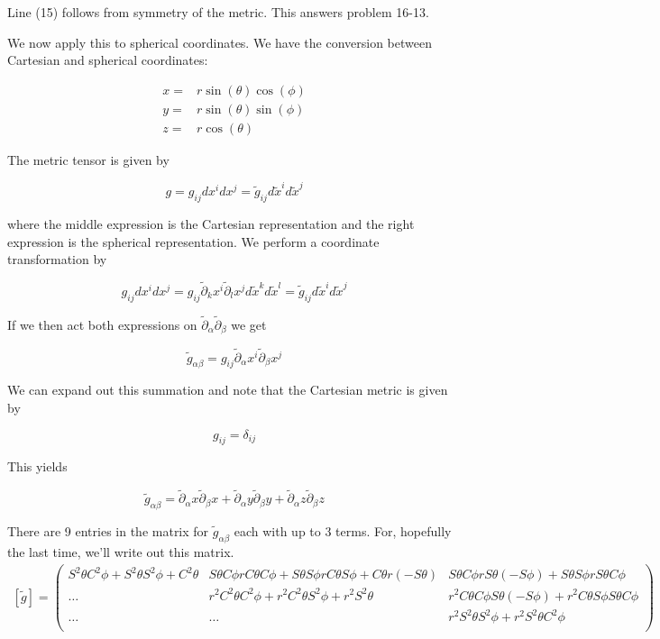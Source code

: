 \documentclass[12pt]{article}
\begin{document}
Line (15) follows from symmetry of the metric.
This answers problem 16-13.

We now apply this to spherical coordinates. We have the conversion between Cartesian and spherical coordinates:

\begin{align}
x =& r \sin(\theta) \cos(\phi)\\
y =& r \sin(\theta) \sin(\phi)\\
z =& r \cos(\theta)
\end{align}

The metric tensor is given by

$$
g = g_{ij} dx^i dx^j = \tilde{g}_{ij} d\tilde{x}^i d\tilde{x}^j
$$

where the middle expression is the Cartesian representation and the right expression is the spherical representation. We perform a coordinate transformation by

$$
g_{ij} dx^i dx^j = g_{ij} \tilde{\partial}_k x^i \tilde{\partial}_l x^j d\tilde{x}^k d\tilde{x}^l = \tilde{g}_{ij} d\tilde{x}^i d\tilde{x}^j
$$

If we then act both expressions on $\tilde{\partial}_{\alpha} \tilde{\partial}_{\beta}$ we get

$$
\tilde{g}_{\alpha\beta} = g_{ij} \tilde{\partial}_{\alpha} x^i \tilde{\partial}_{\beta} x^j
$$

We can expand out this summation and note that the Cartesian metric is given by

$$
g_{ij} = \delta_{ij}
$$

This yields

$$
\tilde{g}_{\alpha\beta} = \tilde{\partial}_{\alpha} x \tilde{\partial}_{\beta} x + \tilde{\partial}_{\alpha} y \tilde{\partial}_{\beta} y + \tilde{\partial}_{\alpha} z \tilde{\partial}_{\beta} z
$$

There are 9 entries in the matrix for $\tilde{g}_{\alpha\beta}$ each with up to 3 terms.
For, hopefully the last time, we'll write out this matrix.
\tiny
\begin{align}
\left[\tilde{g}\right] = \begin{pmatrix}
S^2 \theta C^2 \phi + S^2\theta S^2 \phi + C^2\theta& S\theta C\phi r C\theta C\phi + S\theta S \phi r C \theta S \phi + C\theta r (-S\theta)& S\theta C\phi r S\theta (-S\phi) + S\theta S \phi r S\theta C\phi\\
\ldots & r^2 C^2\theta C^2 \phi + r^2 C^2\theta S^2\phi + r^2 S^2\theta & r^2 C\theta C\phi S\theta (-S\phi) + r^2 C\theta S \phi S\theta C\phi\\
\ldots & \ldots & r^2 S^2\theta S^2 \phi + r^2 S^2\theta C^2\phi\\
\end{pmatrix}
\end{align}
\normalsize
\end{document}
